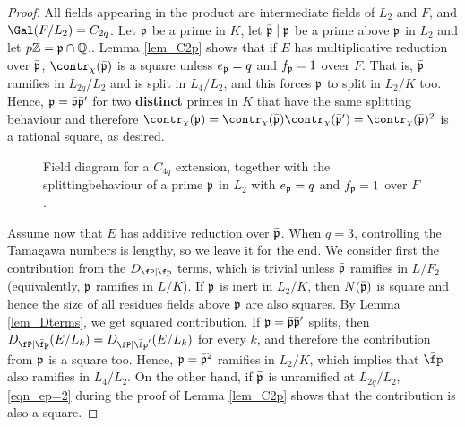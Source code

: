 \begin{proof}
    All fields appearing in the product are intermediate fields of $L_2$ and $F$, and $\Gal(F/L_2)=C_{2q}$. Let $\mathfrak{p}$ be a prime in $K$, let $\bar{\mathfrak{p}}\mid\mathfrak{p}$ be a prime above $\mathfrak{p}$ in $L_2$ and let $p\mathbb{Z}=\mathfrak{p}\cap\mathbb{Q}$.. Lemma \ref{lem_C2p} shows that if $E$ has multiplicative reduction over $\bar{\mathfrak{p}}$, $\contr_\chi(\bar\pp)$ is a square unless $e_{\bar{\mathfrak{p}}}=q$ and $f_{\bar{\mathfrak{p}}}=1$ oveer $F$. That is, $\bar{\mathfrak{p}}$ ramifies in $L_{2q}/L_2$ and is split in $L_4/L_2$, and this forces $\mathfrak{p}$ to split in $L_2/K$ too. Hence, $\mathfrak{p}=\bar{\mathfrak{p}}\bar{\mathfrak{p}}'$ for two \textbf{distinct} primes in $K$ that have the same splitting behaviour and therefore $\contr_\chi(\pp)=\contr_\chi(\bar\pp)\contr_\chi(\bar\pp')=\contr_\chi(\bar\pp)^2$ is a rational square, as desired.

    \begin{figure}[!ht]
        \centering
        \caption[short]{\centering Field diagram for a $C_{4q}$ extension, together with the splitting\newline behaviour of a prime $\mathfrak{p}$ in $L_2$ with $e_{\mathfrak{p}}=q$ and $f_{\mathfrak{p}}=1$ over $F$.}
    \end{figure}

    Assume now that $E$ has additive reduction over $\bar{\mathfrak{p}}$. When $q=3$, controlling the Tamagawa numbers is lengthy, so we leave it for the end. We consider first the contribution from the $D_{\fP\mid\fp}$ terms, which is trivial unless $\bar{\mathfrak{p}}$ ramifies in $L/F_2$ (equivalently, $\mathfrak{p}$ ramifies in $L/K$). If $\mathfrak{p}$ is inert in $L_2/K$, then $N(\bar{\mathfrak{p}})$ is square and hence the size of all residues fields above $\mathfrak{p}$ are also squares. By Lemma \ref{lem_Dterms}, we get squared contribution. If $\mathfrak{p}=\bar{\mathfrak{p}}\bar{\mathfrak{p}}'$ splits, then $D_{\fP\mid\bar\fp}(E/L_k)=D_{\fP\mid\bar\fp'}(E/L_k)$ for every $k$, and therefore the contribution from $\mathfrak{p}$ is a square too. Hence, $\mathfrak{p}=\bar{\mathfrak{p}}^2$ ramifies in $L_2/K$, which implies that $\bar\fp$ also ramifies in $L_4/L_2$. On the other hand, if $\bar{\mathfrak{p}}$ is unramified at $L_{2q}/L_2$, \eqref{eqn_ep=2} during the proof of Lemma \ref{lem_C2p} shows that the contribution is also a square. 


\end{proof}
